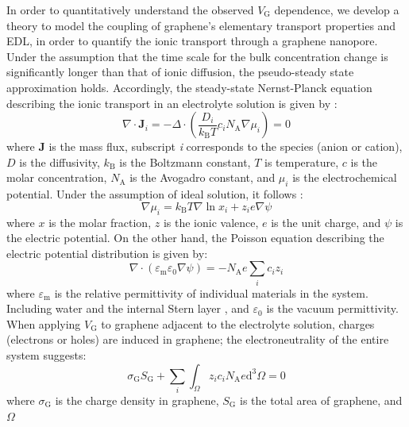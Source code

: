 \documentclass[manuscript=letter, email=true, hyperref=true, keywords=false]{achemso}
\begin{document}
In order to quantitatively understand the observed $V_{\mathrm{G}}$
dependence, we develop a theory to model the coupling of graphene’s
elementary transport properties and EDL, in order to quantify the
ionic transport through a graphene nanopore. Under the assumption that
the time scale for the bulk concentration change is significantly
longer than that of ionic diffusion, the pseudo-steady state
approximation holds. Accordingly, the steady-state Nernst-Planck equation
describing the ionic transport in an electrolyte solution is given by :
\begin{equation}
  \label{eq:pnp}
  \nabla \cdot \boldsymbol{J}_{i} = -\Delta \cdot (\frac{D_{i}}{k_{\mathrm{B}}T} c_{i} N_{\mathrm{A}} \nabla \mu_{i}) = 0
\end{equation}
where $\boldsymbol{J}$ is the mass flux, subscript \textit{i}
corresponds to the species (anion or cation), $D$ is the diffusivity,
$k_{\mathrm{B}}$ is the Boltzmann constant, $T$ is temperature, $c$ is
the molar concentration, $N_{\mathrm{A}}$ is the Avogadro constant,
and $\mu_{i}$ is the electrochemical potential. Under the assumption
of ideal solution, it follows :
\begin{equation}
  \label{eq:mu}
  \nabla \mu_{i} = k_{\mathrm{B}} T \nabla \ln x_{i} + z_{i} e \nabla \psi
\end{equation}
where $x$ is the molar fraction, $z$ is the ionic valence, $e$ is the
unit charge, and $\psi$ is the electric potential. On the other hand,
the Poisson equation describing the electric potential distribution is
given by:
\begin{equation}
  \label{eq:poisson}
  \nabla \cdot (\varepsilon_{\mathrm{m}} \varepsilon_{0} \nabla \psi)
  =
  - N_{\mathrm{A}} e \sum_{i} c_{i} z_{i}
\end{equation}
where $\varepsilon_{\mathrm{m}}$ is the relative permittivity of
individual materials in the system. Including water and the internal
Stern layer , and $\varepsilon_{0}$ is the vacuum
permittivity. When applying $V_{\mathrm{G}}$ to graphene adjacent to
the electrolyte solution, charges (electrons or holes) are induced in
graphene; the electroneutrality of the entire system suggests:
\begin{equation}
  \label{eq:electro-neutral}
  \sigma_{\mathrm{G}} S_{\mathrm{G}} + \sum_{i} \int_{\Omega} z_{i} c_{i} N_{\mathrm{A}} e \mathrm{d}^{3} \Omega= 0
\end{equation}
where $\sigma_{\mathrm{G}}$ is the charge density in graphene,
$S_{\mathrm{G}}$ is the total area of graphene, and $\Omega$
\end{document}
